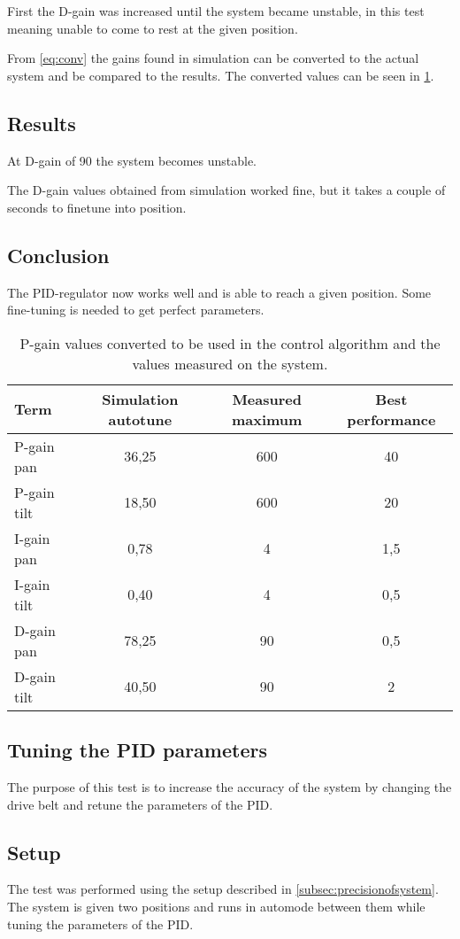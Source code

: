 First the D-gain was increased until the system became unstable, in this test
meaning unable to come to rest at the given position.

From \ref{eq:conv} the gains found in simulation can be converted to the actual
system and be compared to the results. The converted values can be seen in
\ref{tab:actual_gain_values}. 

\subsection*{Results}
At D-gain of 90 the system becomes unstable.

The D-gain values obtained from simulation worked fine, but it takes a couple of
seconds to finetune into position.

\subsection*{Conclusion}
The PID-regulator now works well and is able to reach a given position. Some
fine-tuning is needed to get perfect parameters.

\begin{table}[htb]
	\centering
	\begin{tabular}{lccc}			
	Term & Simulation autotune & Measured maximum & Best performance  \\
	\midrule								
	P-gain pan & 36,25 & 600 & 40 \\
	P-gain tilt   & 18,50 & 600 & 20 \\
	I-gain pan  & 0,78 & 4 & 1,5 \\
	I-gain tilt   & 0,40  & 4 & 0,5 \\
	D-gain pan & 78,25 & 90 & 0,5 \\
	D-gain tilt   & 40,50 & 90 & 2 \\
	\end{tabular}
	\caption{P-gain values converted to be used in the control algorithm and the values measured on the system.}				
	\label{tab:actual_gain_values}			
\end{table}

\subsection{Tuning the PID parameters}
The purpose of this test is to increase the accuracy of the system by changing
the drive belt and retune the parameters of the PID.

\subsection*{Setup}
The test was performed using the setup described in \ref{subsec:precisionofsystem}. The
system is given two positions and runs in automode between them while tuning the
parameters of the PID.

